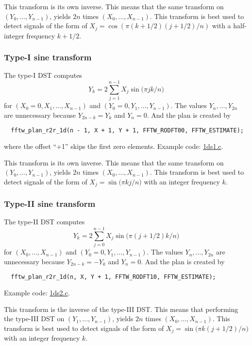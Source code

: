 \documentclass[12pt]{article}
\begin{document}
This transform is its own inverse.
%
This means that the same transform on $(Y_0, \dots, Y_{n-1})$,
  yields $2n$ times $(X_0, \dots, X_{n-1})$.
This transform is best used to detect signals of the form of
  $X_j = \cos(\pi (k + 1/2) (j + 1/2) / n)$
  with a half-integer frequency $k + 1/2$.





\subsubsection{Type-I sine transform}
The type-I DST computes
\begin{equation}
  Y_k = 2 \sum_{j = 1}^{n - 1} X_j \sin\big( \pi j k / n \big)
\end{equation}
%
for $(X_0 = 0, X_1, \dots, X_{n-1})$ and $(Y_0 = 0, Y_1, \dots, Y_{n-1})$.
%
The values $Y_{n}, \dots, Y_{2n}$ are unnecessary because
$Y_{2n - k} = Y_k$ and $Y_n = 0$.
%
And the plan is created by
\begin{verbatim}
  fftw_plan_r2r_1d(n - 1, X + 1, Y + 1, FFTW_RODFT00, FFTW_ESTIMATE);
\end{verbatim}
where the offset ``+1'' skips the first zero elements.
Example code: \url{1ds1.c}.


This transform is its own inverse.
%
This means that the same transform on $(Y_0, \dots, Y_{n-1})$,
  yields $2n$ times $(X_0, \dots, X_{n-1})$.
This transform is best used to detect signals of the form of
  $X_j = \sin\big(\pi k j / n \big)$
  with an integer frequency $k$.





\subsubsection{Type-II sine transform}
The type-II DST computes
\begin{equation}
  Y_k = 2 \sum_{j = 0}^{n - 1} X_j \sin\big( \pi (j + 1/2) k / n \big)
\end{equation}
%
for $(X_0, \dots, X_{n-1})$ and $(Y_0 = 0, Y_1, \dots, Y_{n-1})$.
%
The values $Y_{n}, \dots, Y_{2n}$ are unnecessary because
$Y_{2n - k} = -Y_k$ and $Y_n = 0$.
%
And the plan is created by
\begin{verbatim}
  fftw_plan_r2r_1d(n, X, Y + 1, FFTW_RODFT10, FFTW_ESTIMATE);
\end{verbatim}
Example code: \url{1ds2.c}.


This transform is the inverse of the type-III DST.
%
This means that performing the type-III DST on $(Y_1, \dots, Y_{n-1})$,
  yields $2n$ times $(X_0, \dots, X_{n-1})$.
This transform is best used to detect signals of the form of
  $X_j = \sin\big(\pi k (j + 1/2) / n \big)$
  with an integer frequency $k$.
\end{document}
